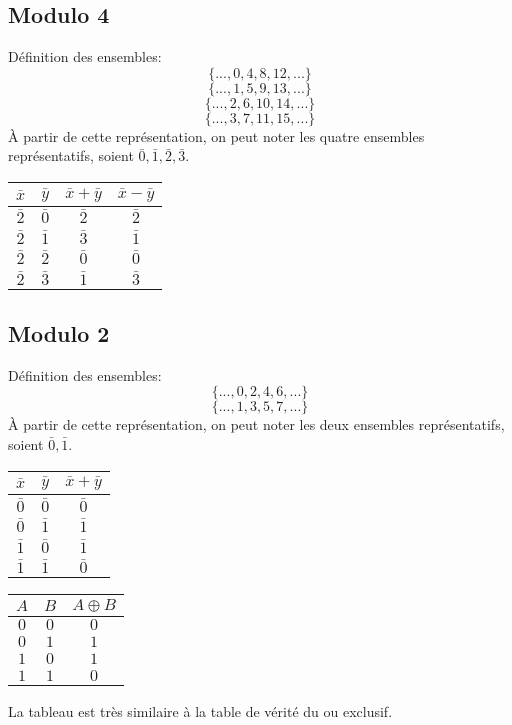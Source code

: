 \documentclass[a4paper,12pt]{article}
\begin{document}
	\subsection{Modulo 4}
		Définition des ensembles:\\
	\[\{...,0,4,8,12,...\}\]
	\[\{...,1,5,9,13,...\}\]
	\[\{...,2,6,10,14,...\}\]
	\[\{...,3,7,11,15,...\}\]
	À partir de cette représentation, on peut noter les quatre ensembles représentatifs, soient $\bar 0, \bar 1, \bar 2, \bar 3$.\linebreak
	\linebreak
	\begin{tabular}{cc|cc}
		$\bar x$&$\bar y$&$\bar x+\bar y$&$\bar x-\bar y$\\
		\hline
		$\bar 2$&$\bar 0$&$\bar 2$&$\bar 2$\\
		$\bar 2$&$\bar 1$&$\bar 3$&$\bar 1$\\
		$\bar 2$&$\bar 2$&$\bar 0$&$\bar 0$\\
		$\bar 2$&$\bar 3$&$\bar 1$&$\bar 3$\\
	\end{tabular}
	\subsection{Modulo 2}
			Définition des ensembles:\\
		\[\{...,0,2,4,6,...\}\]
		\[\{...,1,3,5,7,...\}\]
		À partir de cette représentation, on peut noter les deux ensembles représentatifs, soient $\bar 0, \bar 1$.\linebreak
		\linebreak
		\begin{tabular}{cc|c}
			$\bar x$&$\bar y$&$\bar x+\bar y$\\
			\hline
			$\bar 0$&$\bar 0$&$\bar 0$\\
			$\bar 0$&$\bar 1$&$\bar 1$\\
			$\bar 1$&$\bar 0$&$\bar 1$\\
			$\bar 1$&$\bar 1$&$\bar 0$\\
		\end{tabular}
		\begin{tabular}{cc|c}
			$A$&$B$&$A \oplus B$\\
			\hline
			$0$&$0$&$0$\\
			$0$&$1$&$1$\\
			$1$&$0$&$1$\\
			$1$&$1$&$0$\\
		\end{tabular}\linebreak
		La tableau est très similaire à la table de vérité du ou exclusif.
		\newpage
\end{document}
